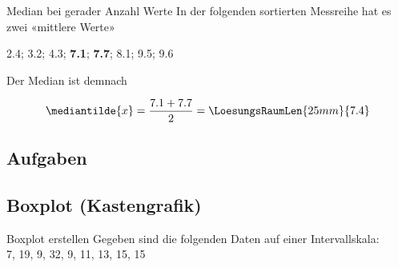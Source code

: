 \begin{beispiel}{Median bei gerader Anzahl Werte}{}
In der folgenden sortierten Messreihe hat es zwei «mittlere Werte»
\begin{center}2.4; 3.2; 4.3; \textbf{7.1}; \textbf{7.7}; 8.1; 9.5; 9.6\end{center}
  Der Median ist demnach

  $$\mediantilde{x} = \frac{7.1 + 7.7}2 = \LoesungsRaumLen{25mm}{7.4}$$

\end{beispiel}

\subsection*{Aufgaben}


\newpage
\subsection{Boxplot (Kastengrafik)}

\begin{beispiel}{Boxplot erstellen}{}
  Gegeben sind die folgenden Daten auf einer Intervallskala:\\
  7, 19, 9, 32, 9, 11, 13, 15, 15
\end{beispiel}


